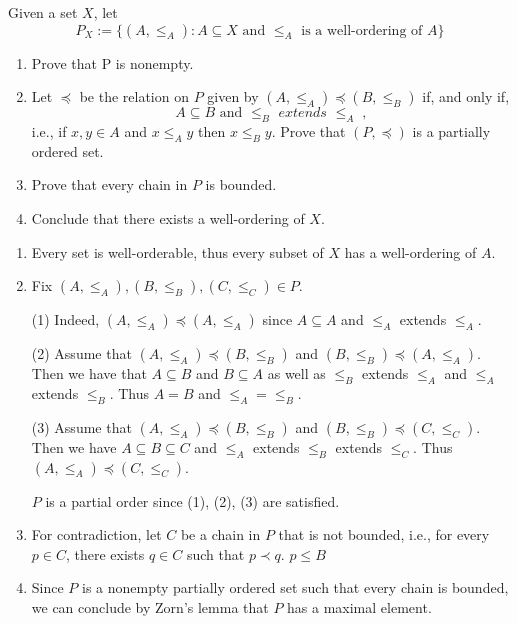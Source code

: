 \documentclass[../main.tex]{subfiles}
\begin{document}
\begin{problem}[7]
    Given a set $X$, let
    \[
        P_X := \{ (A, \le_A) : A \subseteq X \text{ and } \le_A \text{ is a well-ordering of } A \}
    \]
    \begin{enumerate}[label=(\alph*)]
        \item Prove that P is nonempty.
        \item Let $\preceq$ be the relation on $P$ given by $(A, \le_A) \preceq (B, \le_B)$ if, and only if,
            \[
                A \subseteq B \text{ and } \le_B \textit{ extends } \le_A \; ,
            \]
            i.e., if $x, y \in A$ and $x \le_A y$ then $x \le_B y$.
            Prove that $(P, \preceq)$ is a partially ordered set.
        \item Prove that every chain in $P$ is bounded.
        \item Conclude that there exists a well-ordering of $X$.
    \end{enumerate}
\end{problem}
\begin{enumerate}[label=(\alph*)]
    \item Every set is well-orderable, thus every subset of $X$ has a well-ordering of $A$.
    \item Fix $(A, \le_A), (B, \le_B), (C, \le_C) \in P$.

        (1) Indeed, $(A, \le_A) \preceq (A, \le_A)$ since $A \subseteq A$ and $\le_A$ extends $\le_A$.

        (2) Assume that $(A, \le_A) \preceq (B, \le_B)$ and $(B, \le_B) \preceq (A, \le_A)$.
        Then we have that $A \subseteq B$ and $B \subseteq A$ as well as $\le_B$ extends $\le_A$ and $\le_A$ extends $\le_B$.
        Thus $A = B$ and $\le_A = \le_B$.

        (3) Assume that $(A, \le_A) \preceq (B, \le_B)$ and $(B, \le_B) \preceq (C, \le_C)$.
        Then we have $A \subseteq B \subseteq C$ and $\le_A$ extends $\le_B$ extends $\le_C$.
        Thus $(A, \le_A) \preceq (C, \le_C)$.

        $P$ is a partial order since (1), (2), (3) are satisfied.
    \item For contradiction, let $C$ be a chain in $P$ that is not bounded, i.e.,
        for every $p \in C$, there exists $q \in C$ such that $p \prec q$.
        $p \le B$
    \item Since $P$ is a nonempty partially ordered set such that every chain is bounded, we can conclude by Zorn's lemma that $P$ has a maximal element.
\end{enumerate}
\end{document}
